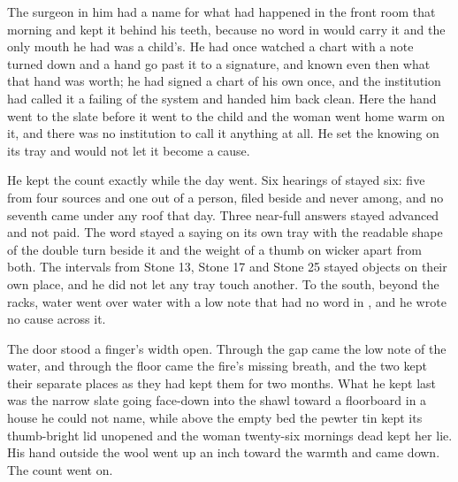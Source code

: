 The surgeon in him had a name for what had happened in the front room that morning and kept it behind his teeth, because no word in  would carry it and the only mouth he had was a child's. He had once watched a chart with a note turned down and a hand go past it to a signature, and known even then what that hand was worth; he had signed a chart of his own once, and the institution had called it a failing of the system and handed him back clean. Here the hand went to the slate before it went to the child and the woman went home warm on it, and there was no institution to call it anything at all. He set the knowing on its tray and would not let it become a cause.

He kept the count exactly while the day went. Six hearings of  stayed six: five from four sources and one out of a person, filed beside and never among, and no seventh came under any roof that day. Three near-full answers stayed advanced and not paid. The word stayed a saying on its own tray with the readable shape of the double turn beside it and the weight of a thumb on wicker apart from both. The intervals from Stone 13, Stone 17 and Stone 25 stayed objects on their own place, and he did not let any tray touch another. To the south, beyond the racks, water went over water with a low note that had no word in , and he wrote no cause across it.

The door stood a finger's width open. Through the gap came the low note of the water, and through the floor came the fire's missing breath, and the two kept their separate places as they had kept them for two months. What he kept last was the narrow slate going face-down into the shawl toward a floorboard in a house he could not name, while above the empty bed the pewter tin kept its thumb-bright lid unopened and the woman twenty-six mornings dead kept her lie. His hand outside the wool went up an inch toward the warmth and came down. The count went on.
